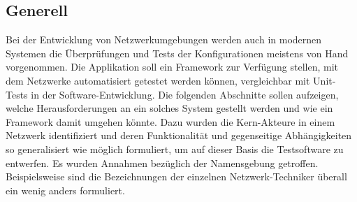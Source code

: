 \documentclass[
	ngerman,
	toc=listof, %
	toc=bibliography, %
	footnotes=multiple, %
	parskip=half, %
	numbers=noendperiod %
]{scrartcl}
\begin{document}
	\subsection{Generell}
		Bei der Entwicklung von Netzwerkumgebungen werden auch in modernen Systemen die Überprüfungen und Tests der Konfigurationen meistens von Hand vorgenommen.
		Die Applikation soll ein Framework zur Verfügung stellen, mit dem Netzwerke automatisiert getestet werden können, vergleichbar mit Unit-Tests in der Software-Entwicklung.
		Die folgenden Abschnitte sollen aufzeigen, welche Herausforderungen an ein solches System gestellt werden und wie ein Framework damit umgehen könnte.
		Dazu wurden die Kern-Akteure in einem Netzwerk identifiziert und deren Funktionalität und gegenseitige Abhängigkeiten so generalisiert wie möglich formuliert, um auf dieser Basis die Testsoftware zu entwerfen.
		Es wurden Annahmen bezüglich der Namensgebung getroffen. Beispielsweise sind die Bezeichnungen der einzelnen Netzwerk-Techniker überall ein wenig anders formuliert.
\end{document}
